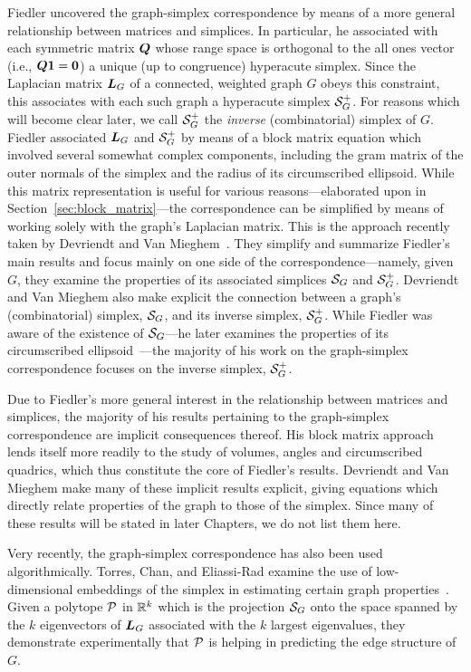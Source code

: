 Fiedler uncovered  the graph-simplex correspondence by means of  a more general  relationship between matrices and simplices.  In particular, he associated with each symmetric matrix $\Q$ whose range space is orthogonal to the all ones vector (i.e.,  $\Q\one=\zero$) a unique (up to congruence) hyperacute simplex. Since the Laplacian  matrix  $\L_G$ of a connected, weighted graph  $G$ obeys this constraint, this associates with  each such graph a hyperacute simplex  $\splx_G^+$.   
For  reasons which will become clear later, we call $\splx_G^+$ the \emph{inverse} (combinatorial) simplex of $G$. 
Fiedler associated $\L_G$ and $\splx_G^+$  by means of a block matrix equation which involved several somewhat complex components, including  the gram matrix of the outer normals of the simplex and  the radius of its circumscribed ellipsoid. While this matrix representation is useful for various reasons---elaborated upon in  Section~\ref{sec:block_matrix}---the correspondence can  be simplified  by means of working solely  with the graph's Laplacian  matrix. This is the approach  recently taken by Devriendt  and  Van  Mieghem~\cite{devriendt2018simplex}. They simplify and summarize Fiedler's main  results and focus mainly on one  side of the correspondence---namely,  given $G$,  they examine  the properties of  its associated  simplices $\splx_G$ and $\splx_G^+$. 
Devriendt and  Van Mieghem also make explicit the connection between a graph's (combinatorial) simplex, $\splx_G$, and  its  inverse  simplex, $\splx_G^+$. While Fiedler was aware  of the existence of  $\splx_G$---he later examines the properties of its circumscribed ellipsoid~\cite{fiedler2005geometry}---the  majority of his  work on  the graph-simplex  correspondence focuses on the inverse simplex, $\splx_G^+$. 

Due to Fiedler's more general interest in the relationship between matrices and simplices, the majority of  his  results pertaining  to the graph-simplex correspondence are implicit consequences thereof. His block matrix approach lends itself more readily to the study of volumes, angles and circumscribed quadrics, which thus constitute the core of Fiedler's results. Devriendt and Van Mieghem make many of these implicit results explicit, giving equations which directly relate properties of the  graph to those of the simplex. Since many of these results will be stated in later  Chapters,  we do not list them here. 

Very recently, the graph-simplex correspondence has also been used algorithmically. Torres, Chan, and Eliassi-Rad examine the use of  low-dimensional embeddings of the simplex in estimating certain graph properties~\cite{torres2019geometric}. 
Given a polytope $\P$ in $\R^k$ which is the projection $\splx_G$ onto the space spanned by the $k$ eigenvectors of $\L_G$ associated  with the $k$ largest  eigenvalues, they demonstrate experimentally that $\P$ is helping in predicting the edge structure of $G$. 

